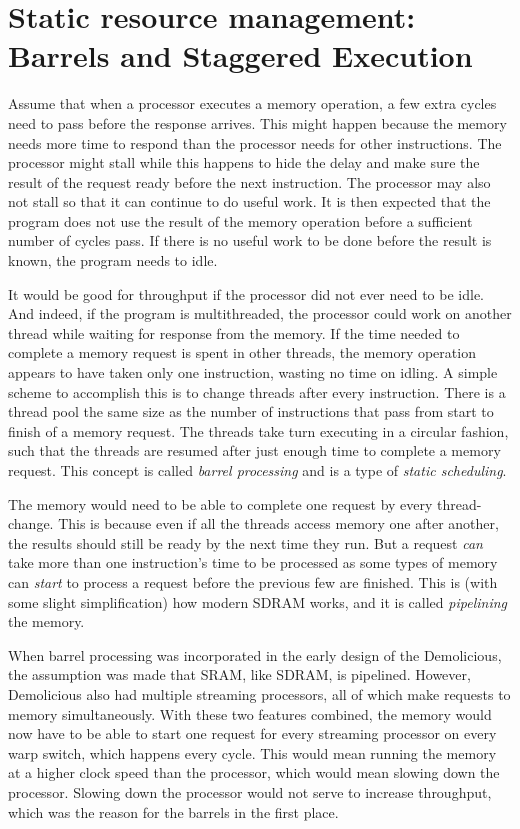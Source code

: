 \documentclass[../main/report.tex]{subfiles}
\begin{document}
\section{Static resource management: Barrels and Staggered Execution}

Assume that when a processor executes a memory operation, a few extra cycles need to pass before the response arrives.
This might happen because the memory needs more time to respond than the processor needs for other instructions.
The processor might stall while this happens to hide the delay and make sure the result of the request ready before the next instruction.
The processor may also not stall so that it can continue to do useful work.
It is then expected that the program does not use the result of the memory operation before a sufficient number of cycles pass.
If there is no useful work to be done before the result is known, the program needs to idle.

It would be good for throughput if the processor did not ever need to be idle.
And indeed, if the program is multithreaded, the processor could work on another thread while waiting for response from the memory.
If the time needed to complete a memory request is spent in other threads, the memory operation appears to have taken only one instruction, wasting no time on idling.
A simple scheme to accomplish this is to change threads after every instruction.
There is a thread pool the same size as the number of instructions that pass from start to finish of a memory request.
The threads take turn executing in a circular fashion, such that the threads are resumed after just enough time to complete a memory request.
This concept is called \emph{barrel processing} and is a type of \emph{static scheduling}.

The memory would need to be able to complete one request by every thread-change.
This is because even if all the threads access memory one after another, the results should still be ready by the next time they run.
But a request \emph{can} take more than one instruction's time to be processed as some types of memory can \emph{start} to process a request before the previous few are finished.
This is (with some slight simplification) how modern SDRAM works, and it is called \emph{pipelining} the memory.

When barrel processing was incorporated in the early design of the Demolicious, the assumption was made that SRAM, like SDRAM, is pipelined.
However, Demolicious also had multiple streaming processors, all of which make requests to memory simultaneously.
With these two features combined, the memory would now have to be able to start one request for every streaming processor on every warp switch, which happens every cycle.
This would mean running the memory at a higher clock speed than the processor, which would mean slowing down the processor.
Slowing down the processor would not serve to increase throughput, which was the reason for the barrels in the first place.
\end{document}
